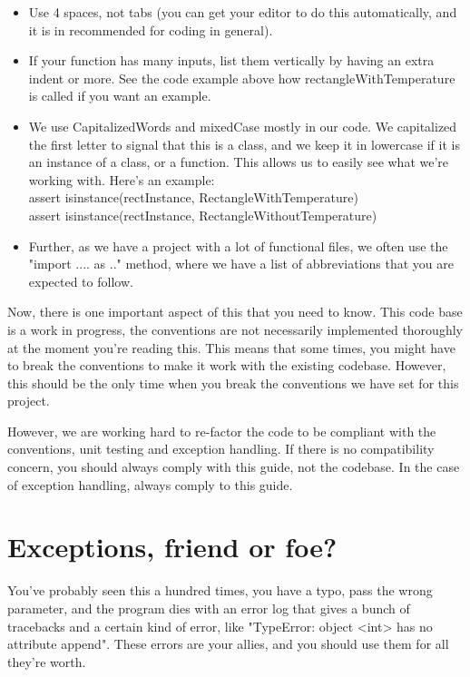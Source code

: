 \documentclass[10pt,a4paper]{article}
\begin{document}
\begin{itemize}
\item Use 4 spaces, not tabs (you can get your editor to do this automatically, and it is in recommended for coding in general).
\item If your function has many inputs, list them vertically by having an extra indent or more. See the code example above how rectangleWithTemperature is called if you want an example.
\item We use CapitalizedWords and mixedCase mostly in our code. We capitalized the first letter to signal that this is a class, and we keep it in lowercase if it is an instance of a class, or a function. This allows us to easily see what we're working with. Here's an example:\\
assert isinstance(rectInstance, RectangleWithTemperature) \\
assert isinstance(rectInstance, RectangleWithoutTemperature) %
\item Further, as we have a project with a lot of functional files, we often use the "import .... as .." method, where we have a list of abbreviations that you are expected to follow.
\end{itemize}

Now, there is one important aspect of this that you need to know. This code base is a work in progress, the conventions are not necessarily implemented thoroughly at the moment you're reading this. This means that some times, you might have to break the conventions to make it work with the existing codebase. However, this should be the only time when you break the conventions we have set for this project.

However, we are working hard to re-factor the code to be compliant with the conventions, unit testing and exception handling. If there is no compatibility concern, you should always comply with this guide, not the codebase. In the case of exception handling, always comply to this guide.


\section{Exceptions, friend or foe?}

You've probably seen this a hundred times, you have a typo, pass the wrong parameter, and the program dies with an error log that gives a bunch of tracebacks and a certain kind of error, like "TypeError: object <int> has no attribute append". These errors are your allies, and you should use them for all they're worth. 
\end{document}
